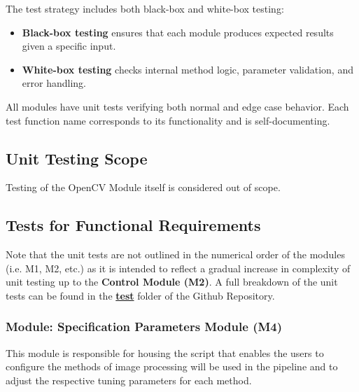 \documentclass[12pt, titlepage]{article}
\begin{document}
The test strategy includes both black-box and white-box testing:
\begin{itemize}
  \item \textbf{Black-box testing} ensures that each module produces expected results given a specific input.
  \item \textbf{White-box testing} checks internal method logic, parameter validation, and error handling.
\end{itemize}

All modules have unit tests verifying both normal and edge case behavior. Each test function name corresponds to its functionality and is self-documenting.

\subsection{Unit Testing Scope}

Testing of the OpenCV Module itself is considered out of scope.

\subsection{Tests for Functional Requirements}
Note that the unit tests are not outlined in the numerical order of the modules (i.e. M1, M2, etc.) as it is intended to reflect a gradual increase in complexity of unit testing up to the \textbf{Control Module (M2)}. A full breakdown of the unit tests can be found in the \href{https://github.com/KiranSingh15/CAS-741-Image-Correspondences/tree/main/test}{\textbf{test}} folder of the Github Repository.


\subsubsection{Module: Specification Parameters Module (M4)}
This module is responsible for housing the script that enables the users to configure the methods of image processing will be used in the pipeline and to adjust the respective tuning parameters for each method.
\end{document}
